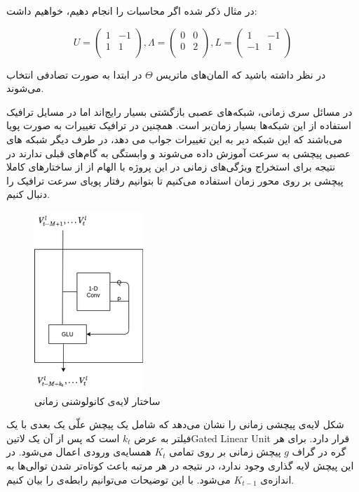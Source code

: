 \documentclass{article}
\begin{document}
در مثال ذکر شده اگر محاسبات را انجام دهیم، خواهیم داشت:

\[
U = \left(
  \begin{array}{cc}
  1 & -1 \\
  1 & 1 \\
  \end{array}
\right),
\Lambda = \left(
  \begin{array}{cc}
  0 & 0 \\
  0 & 2 \\
  \end{array}
\right),
L = \left(
  \begin{array}{cc}
  1 & -1 \\
  -1 & 1 \\
  \end{array}
\right)
\]

در نظر داشته باشید که المان‌های ماتریس $\Theta$ در ابتدا به صورت تصادفی انتخاب می‌شوند.

در مسائل سری زمانی، شبکه‌های عصبی بازگشتی بسیار رایج‌اند اما در مسایل ترافیک استفاده از این شبکه‌ها بسیار زمان‌بر است.
همچنین در ترافیک تغییرات به صورت پویا می‌باشند که این شبکه دیر به این تغییرات جواب می دهد،
در طرف دیگر شبکه های عصبی پیچشی به سرعت آموزش داده می‌شوند و وابستگی به گام‌های قبلی ندارند در نتیجه برای استخراج ویژگی‌های زمانی در این پروژه با الهام از
 از ساختارهای کاملا پیچشی بر روی محور زمان استفاده می‌کنیم تا بتوانیم رفتار پویای سرعت ترافیک را دنبال کنیم.

\begin{figure}
  \includegraphics{./images/time-conv.png}
  \centering
  \caption{
ساختار لایه‌ی کانولوشنی زمانی 
  }
  \label{fig:time-conv}
\end{figure}

شکل  لایه‌ی پیچشی زمانی را نشان می‌دهد که شامل یک پیچش علّی یک بعدی
با یک فیلتر به عرض  $k_{t}$ است که پس از آن یک ‌لاتین{Gated Linear Unit} قرار دارد.
برای هر گره در گراف $g$ پیچش زمانی بر روی تمامی $K_{t}$ همسایه‌ی ورودی اعمال می‌شود.
در این پیچش لایه گذاری وجود ندارد‌‌، در نتیجه در هر مرتبه باعث کوتاه‌تر شدن توالی‌ها به اندازه‌ی $K_{t-1}$ می‌شود.
با این توضیحات می‌توانیم رابطه‌ی  را بیان کنیم.
\end{document}

